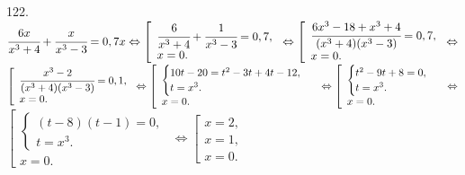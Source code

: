 122. $\cfrac{6x}{x^3+4}+\cfrac{x}{x^3-3}=0,7x\Leftrightarrow
\left[\begin{array}{l}\cfrac{6}{x^3+4}+\cfrac{1}{x^3-3}=0,7,\\ x=0.\end{array}\right.\Leftrightarrow
\left[\begin{array}{l}\cfrac{6x^3-18+x^3+4}{(x^3+4)(x^3-3)}=0,7,\\ x=0.\end{array}\right.\Leftrightarrow$\\$
\left[\begin{array}{l}\cfrac{x^3-2}{(x^3+4)(x^3-3)}=0,1,\\ x=0.\end{array}\right.\Leftrightarrow
\left[\begin{array}{l}\begin{cases} 10t-20=t^2-3t+4t-12,\\t=x^3.\end{cases}\\ x=0.\end{array}\right.\Leftrightarrow
\left[\begin{array}{l}\begin{cases} t^2-9t+8=0,\\t=x^3.\end{cases}\\ x=0.\end{array}\right.\Leftrightarrow$\\$
\left[\begin{array}{l}\begin{cases} (t-8)(t-1)=0,\\t=x^3.\end{cases}\\ x=0.\end{array}\right.\Leftrightarrow
\left[\begin{array}{l}x=2,\\ x=1, \\ x=0.\end{array}\right.$\\
